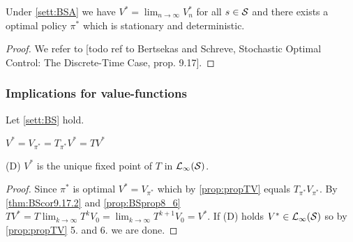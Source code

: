 \begin{thm}[Prop. 9.17 BS]
  Under \cref{sett:BSA} we have
  $V^* = \lim_{n \to \infty} V^*_n$ for all $s \in \mathcal{S}$
  and there exists a optimal policy $\pi^*$ which is stationary
  and deterministic.
\end{thm}
\begin{proof}
  We refer to [todo ref to Bertsekas and Schreve, Stochastic Optimal Control:
  The Discrete-Time Case, prop. 9.17].
\end{proof}

\subsubsection{Implications for value-functions}
Let \cref{sett:BS} hold.

\begin{prop}
  $V^* = V_{\pi^*} = T_{\pi^*} V^* = T V^*$
  
  (D) $V^*$ is the unique fixed point of $T$ in $\mathcal{L}_\infty(\mathcal{S})$.
  \label{prop:VoptEqVpiOpt}
\end{prop}
\begin{proof}
  Since $\pi^*$ is optimal $V^* = V_{\pi^*}$ which by \cref{prop:propTV}
  equals $T_{\pi^*} V_{\pi^*}$.
  By \cref{thm:BScor9.17.2} and \cref{prop:BSprop8_6}
  $T V^* = T \lim_{k\to\infty} T^k V_0 =
  \lim_{k\to\infty} T^{k+1} V_0 = V^*$.
  If (D) holds $V^* \in \mathcal{L}_\infty(\mathcal{S})$ so by \cref{prop:propTV} 5.
  and 6. we are done.
\end{proof}

